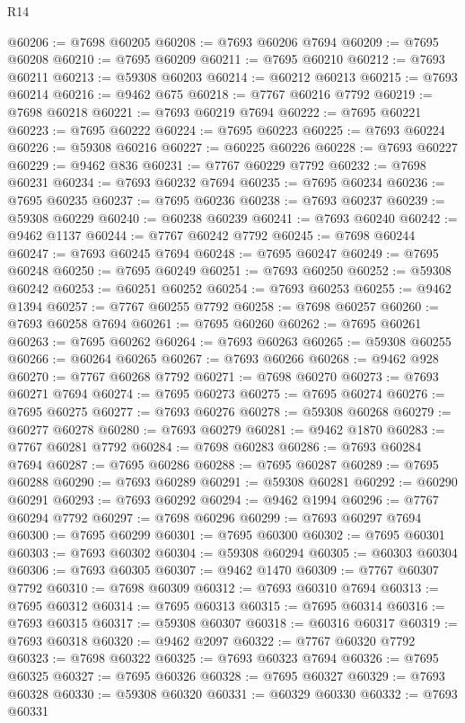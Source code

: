 \begin{lexlean}{R14}
\begin{coremodule}
@60206 := @7698 @60205
@60208 := @7693 @60206 @7694
@60209 := @7695 @60208
@60210 := @7695 @60209
@60211 := @7695 @60210
@60212 := @7693 @60211
@60213 := @59308 @60203
@60214 := @60212 @60213
@60215 := @7693 @60214
@60216 := @9462 @675
@60218 := @7767 @60216 @7792
@60219 := @7698 @60218
@60221 := @7693 @60219 @7694
@60222 := @7695 @60221
@60223 := @7695 @60222
@60224 := @7695 @60223
@60225 := @7693 @60224
@60226 := @59308 @60216
@60227 := @60225 @60226
@60228 := @7693 @60227
@60229 := @9462 @836
@60231 := @7767 @60229 @7792
@60232 := @7698 @60231
@60234 := @7693 @60232 @7694
@60235 := @7695 @60234
@60236 := @7695 @60235
@60237 := @7695 @60236
@60238 := @7693 @60237
@60239 := @59308 @60229
@60240 := @60238 @60239
@60241 := @7693 @60240
@60242 := @9462 @1137
@60244 := @7767 @60242 @7792
@60245 := @7698 @60244
@60247 := @7693 @60245 @7694
@60248 := @7695 @60247
@60249 := @7695 @60248
@60250 := @7695 @60249
@60251 := @7693 @60250
@60252 := @59308 @60242
@60253 := @60251 @60252
@60254 := @7693 @60253
@60255 := @9462 @1394
@60257 := @7767 @60255 @7792
@60258 := @7698 @60257
@60260 := @7693 @60258 @7694
@60261 := @7695 @60260
@60262 := @7695 @60261
@60263 := @7695 @60262
@60264 := @7693 @60263
@60265 := @59308 @60255
@60266 := @60264 @60265
@60267 := @7693 @60266
@60268 := @9462 @928
@60270 := @7767 @60268 @7792
@60271 := @7698 @60270
@60273 := @7693 @60271 @7694
@60274 := @7695 @60273
@60275 := @7695 @60274
@60276 := @7695 @60275
@60277 := @7693 @60276
@60278 := @59308 @60268
@60279 := @60277 @60278
@60280 := @7693 @60279
@60281 := @9462 @1870
@60283 := @7767 @60281 @7792
@60284 := @7698 @60283
@60286 := @7693 @60284 @7694
@60287 := @7695 @60286
@60288 := @7695 @60287
@60289 := @7695 @60288
@60290 := @7693 @60289
@60291 := @59308 @60281
@60292 := @60290 @60291
@60293 := @7693 @60292
@60294 := @9462 @1994
@60296 := @7767 @60294 @7792
@60297 := @7698 @60296
@60299 := @7693 @60297 @7694
@60300 := @7695 @60299
@60301 := @7695 @60300
@60302 := @7695 @60301
@60303 := @7693 @60302
@60304 := @59308 @60294
@60305 := @60303 @60304
@60306 := @7693 @60305
@60307 := @9462 @1470
@60309 := @7767 @60307 @7792
@60310 := @7698 @60309
@60312 := @7693 @60310 @7694
@60313 := @7695 @60312
@60314 := @7695 @60313
@60315 := @7695 @60314
@60316 := @7693 @60315
@60317 := @59308 @60307
@60318 := @60316 @60317
@60319 := @7693 @60318
@60320 := @9462 @2097
@60322 := @7767 @60320 @7792
@60323 := @7698 @60322
@60325 := @7693 @60323 @7694
@60326 := @7695 @60325
@60327 := @7695 @60326
@60328 := @7695 @60327
@60329 := @7693 @60328
@60330 := @59308 @60320
@60331 := @60329 @60330
@60332 := @7693 @60331

\end{coremodule}
\end{lexlean}
